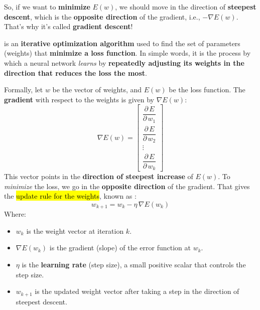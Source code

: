 \highspace
\textcolor{Green3}{} So, if we want to \textbf{minimize} $E(w)$, we should move in the direction of \textbf{steepest descent}, which is the \textbf{opposite direction} of the gradient, i.e., $-\nabla E(w)$. That's why it's called \textbf{gradient descent}!

\highspace
\begin{definitionbox}
     is an \textbf{iterative optimization algorithm} used to find the set of parameters (weights) that \textbf{minimize a loss function}. In simple words, it is the process by which a neural network \emph{learns} by \textbf{repeatedly adjusting its weights in the direction that reduces the loss the most}.

    \highspace
    Formally, let $w$ be the vector of weights, and $E(w)$ be the loss function. The \textbf{gradient} with respect to the weights is given by $\nabla E(w)$:
    \begin{equation}
        \nabla E(w) = \begin{bmatrix}
            \dfrac{\partial \, E}{\partial \, w_{1}} \\[1.2em]
            \dfrac{\partial \, E}{\partial \, w_{2}} \\[1.2em]
            \vdots \\
            \dfrac{\partial \, E}{\partial \, w_{k}}
        \end{bmatrix}
    \end{equation}
    This vector points in the \textbf{direction of steepest increase} of $E(w)$. To \emph{minimize} the loss, we go in the \textbf{opposite direction} of the gradient. That gives the \hl{update rule for the weights}, known as :
    \begin{equation}
        w_{k+1} = w_{k} - \eta \,\nabla E(w_{k})
    \end{equation}
    Where:
    \begin{itemize}
        \item $w_{k}$ is the weight vector at iteration $k$.
        \item $\nabla E(w_{k})$ is the gradient (slope) of the error function at $w_{k}$.
        \item $\eta$ is the \textbf{learning rate} (step size), a small positive scalar that controls the step size.
        \item $w_{k+1}$ is the updated weight vector after taking a step in the direction of steepest descent.
    \end{itemize}

\end{definitionbox}

